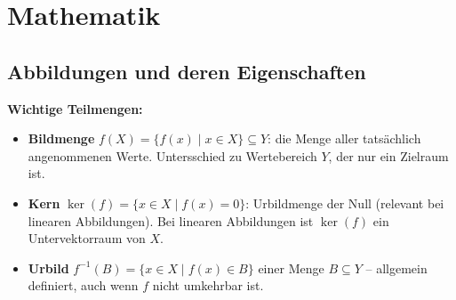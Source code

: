 \section{Mathematik}

\subsection{Abbildungen und deren Eigenschaften}


\textbf{Wichtige Teilmengen:}
\begin{itemize}[leftmargin=1.5em]
    \item \textbf{Bildmenge} $f(X) = \{ f(x) \mid x \in X \} \subseteq Y$: die Menge aller tatsächlich angenommenen Werte. Untersschied zu Wertebereich $Y$, der nur ein Zielraum ist.
    \item \textbf{Kern} $\ker(f) = \{ x \in X \mid f(x) = 0 \}$: Urbildmenge der Null (relevant bei linearen Abbildungen). Bei linearen Abbildungen ist $\ker(f)$ ein Untervektorraum von $X$.
    \item \textbf{Urbild} $f^{-1}(B) = \{x \in X \mid f(x) \in B\}$ einer Menge $B \subseteq Y$ -- allgemein definiert, auch wenn $f$ nicht umkehrbar ist.
\end{itemize}

